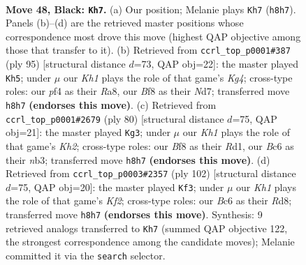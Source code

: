 \documentclass[11pt]{article}
\begin{document}
\clearpage

\begin{figure}[p]\centering
\begin{subfigure}{0.46\textwidth}\centering
\resizebox{\linewidth}{!}{%
\newchessgame
\chessboard[
  setfen={2r2bnk/p5p1/P1b5/1p3p1p/1P3P2/1R2P1PK/8/RNB5 b - - 11 48},
  showmover=false,
  pgfstyle=straightmove, color=movearrow, markmove={h8-h7}
]}
\caption{}
\end{subfigure}\hfill
\begin{subfigure}{0.46\textwidth}\centering
\resizebox{\linewidth}{!}{%
\newchessgame
\chessboard[
  setfen={r7/3n1pb1/4p3/1Np1P1k1/p1P4p/P7/KP2R1PB/8 b - - 1 48},
  showmover=false,
  pgfstyle=straightmove, color=movearrow, markmove={g5-h5}
]}
\caption{}
\end{subfigure}
\\[4pt]
\begin{subfigure}{0.46\textwidth}\centering
\resizebox{\linewidth}{!}{%
\newchessgame
\chessboard[
  setfen={5rk1/1p3p2/4r1p1/pB1p2P1/P3bB1R/1nP4P/1P5K/3R4 w - - 3 41},
  showmover=false,
  pgfstyle=straightmove, color=movearrow, markmove={h2-g3}
]}
\caption{}
\end{subfigure}\hfill
\begin{subfigure}{0.46\textwidth}\centering
\resizebox{\linewidth}{!}{%
\newchessgame
\chessboard[
  setfen={3R4/2r1p3/5kp1/2n4p/p1P2P1P/6P1/P1R1BK2/1r6 w - - 25 52},
  showmover=false,
  pgfstyle=straightmove, color=movearrow, markmove={f2-f3}
]}
\caption{}
\end{subfigure}
\caption{\textbf{Move 48, Black: \texttt{Kh7}.} (a) Our position; Melanie plays \texttt{Kh7} (\texttt{h8h7}). Panels (b)--(d) are the retrieved master positions whose correspondence most drove this move (highest QAP objective among those that transfer to it). (b) Retrieved from \texttt{ccrl\_top\_p0001\#387} (ply 95) [structural distance $d$=73, QAP obj=22]: the master played \texttt{Kh5}; under $\mu$ our \emph{Kh1} plays the role of that game's \emph{Kg4}; cross-type roles: our \emph{p}f4 as their \emph{R}a8, our \emph{B}f8 as their \emph{N}d7; transferred move \texttt{h8h7} \textbf{(endorses this move)}. (c) Retrieved from \texttt{ccrl\_top\_p0001\#2679} (ply 80) [structural distance $d$=75, QAP obj=21]: the master played \texttt{Kg3}; under $\mu$ our \emph{Kh1} plays the role of that game's \emph{Kh2}; cross-type roles: our \emph{B}f8 as their \emph{R}d1, our \emph{B}c6 as their \emph{n}b3; transferred move \texttt{h8h7} \textbf{(endorses this move)}. (d) Retrieved from \texttt{ccrl\_top\_p0003\#2357} (ply 102) [structural distance $d$=75, QAP obj=20]: the master played \texttt{Kf3}; under $\mu$ our \emph{Kh1} plays the role of that game's \emph{Kf2}; cross-type roles: our \emph{B}c6 as their \emph{R}d8; transferred move \texttt{h8h7} \textbf{(endorses this move)}. Synthesis: 9 retrieved analogs transferred to \texttt{Kh7} (summed QAP objective 122, the strongest correspondence among the candidate moves); Melanie committed it via the \texttt{search} selector.}
\label{fig:thought-m95}
\end{figure}
\end{document}

